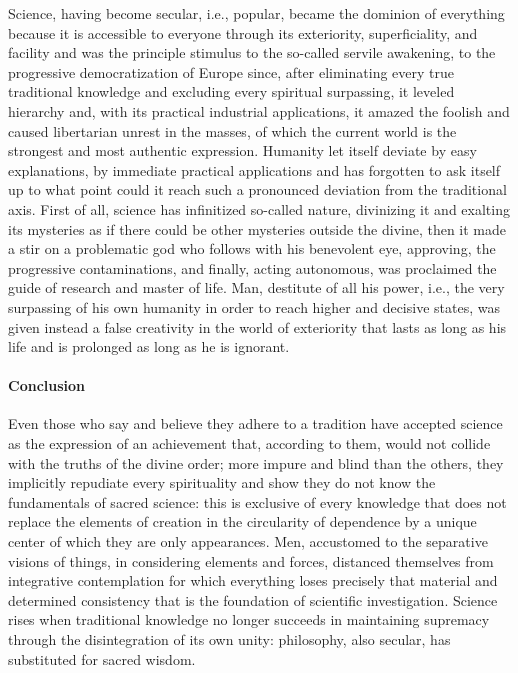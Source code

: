 Science, having become secular, i.e., popular, became the dominion of everything because it is accessible to everyone through its exteriority, superficiality, and facility and was the principle stimulus to the so-called servile awakening, to the progressive democratization of Europe since, after eliminating every true traditional knowledge and excluding every spiritual surpassing, it leveled hierarchy and, with its practical industrial applications, it amazed the foolish and caused libertarian unrest in the masses, of which the current world is the strongest and most authentic expression. Humanity let itself deviate by easy explanations, by immediate practical applications and has forgotten to ask itself up to what point could it reach such a pronounced deviation from the traditional axis. First of all, science has infinitized so-called nature, divinizing it and exalting its mysteries as if there could be other mysteries outside the divine, then it made a stir on a problematic god who follows with his benevolent eye, approving, the progressive contaminations, and finally, acting autonomous, was proclaimed the guide of research and master of life. Man, destitute of all his power, i.e., the very surpassing of his own humanity in order to reach higher and decisive states, was given instead a false creativity in the world of exteriority that lasts as long as his life and is prolonged as long as he is ignorant.

\paragraph{Conclusion}

Even those who say and believe they adhere to a tradition have accepted science as the expression of an achievement that, according to them, would not collide with the truths of the divine order; more impure and blind than the others, they implicitly repudiate every spirituality and show they do not know the fundamentals of sacred science: this is exclusive of every knowledge that does not replace the elements of creation in the circularity of dependence by a unique center of which they are only appearances. Men, accustomed to the separative visions of things, in considering elements and forces, distanced themselves from integrative contemplation for which everything loses precisely that material and determined consistency that is the foundation of scientific investigation. Science rises when traditional knowledge no longer succeeds in maintaining supremacy through the disintegration of its own unity: philosophy, also secular, has substituted for sacred wisdom.

